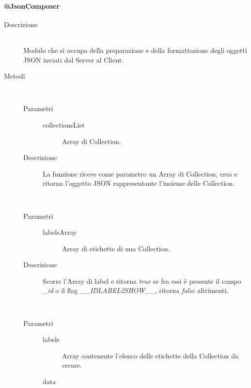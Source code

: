 \paragraph{@JsonComposer}
\begin{description}
 \item[Descrizione] \hfill \\
 Modulo che si occupa della preparazione e della formattazione degli oggetti JSON inviati dal Server al Client.
 
 \item[Metodi] \hfill
 \begin{mldescription}
   \hfill \\
   \begin{description}
    \item[Parametri]
     \begin{description}
      \item[collectionsList]
      Array di Collection.
     \end{description}
    \item[Descrizione]
    La funzione riceve come parametro un Array di Collection, crea e ritorna l'oggetto JSON rappresentante l'insieme delle Collection.
   \end{description}
  
   \hfill \\
   \begin{description}
    \item[Parametri]
     \begin{description}
      \item[labelsArray]
      Array di etichette di una Collection.
     \end{description}
    \item[Descrizione]
    Scorre l'Array di label e ritorna \textit{true} se fra essi è presente il campo \textit{\_id} o il flag \textit{\_\_IDLABEL2SHOW\_\_}, ritorna \textit{false} altrimenti.
   \end{description}
   
   \hfill \\
   \begin{description}
    \item[Parametri]
     \begin{description}
      \item[labels]
      Array contenente l'elenco delle etichette della Collection da creare.
      \item[data]
      

\end{description}
\end{description}
\end{mldescription}
\end{description}
